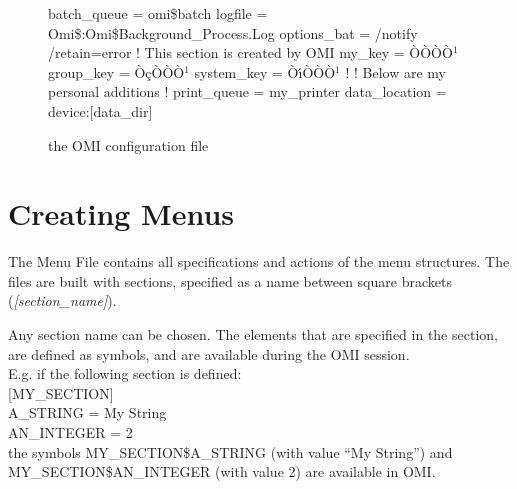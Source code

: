 \documentclass[a4paper]{book}
\newcommand{\vs}{\vspace{3mm}}
\renewcommand{\indent}{\hspace*{5mm}}
\begin{document}
\begin{figure}[h!tb]
\begin{minipage}[h!tb]{\textwidth}
\begin{ttfamily}
 \newline
\noindent[bgrprocess] \newline
\indent batch{\_}queue = omi{\$}batch \newline
\indent logfile = Omi{\$}:Omi{\$}Background{\_}Process.Log \newline
\indent options{\_}bat = /notify /retain=error \newline
 \newline
\noindent[keyring] ! This section is created by OMI \newline
\indent my{\_}key = \`{O}\`{O}\`{O}\`{O}$^{1}$ \newline
\indent group{\_}key = \`{O}\c{c}\`{O}\`{O}\`{O}$^{1}$ \newline
\indent system{\_}key = \`{O}\'{\i}\`{O}\`{O}\`{O}$^{1}$ \newline
 \newline
\noindent! \newline
\noindent! Below are my personal additions \newline
\noindent! \newline
\noindent[mydefs] \newline
\indent print{\_}queue = my{\_}printer \newline
\indent data{\_}location = device:[data{\_}dir] \newline
\end{ttfamily} \newline
\caption{the OMI configuration file}\label{fig:omiconfig}
\hrulefill
\end{minipage}
\end{figure}

\chapter{Creating Menus}
\label{sec:creating}

The Menu File contains all specifications and actions of the menu 
structures. The files are built with sections, specified as a name between 
square brackets (\textsl{[section{\_}name]}).

\vs

Any section name can be chosen. The elements that are specified in the 
section, are defined as symbols, and are available during the OMI session. \\
E.g. if the following section is defined: \\
\indent\textsf{[MY{\_}SECTION]} \\
\indent\indent\textsf{A{\_}STRING = My String} \\
\indent\indent\textsf{AN{\_}INTEGER = 2} \\
the symbols MY{\_}SECTION{\$}A{\_}STRING (with value ``My String'') and 
\linebreak MY{\_}SECTION{\$}AN{\_}INTEGER (with value 2) are available in OMI.
\end{document}
